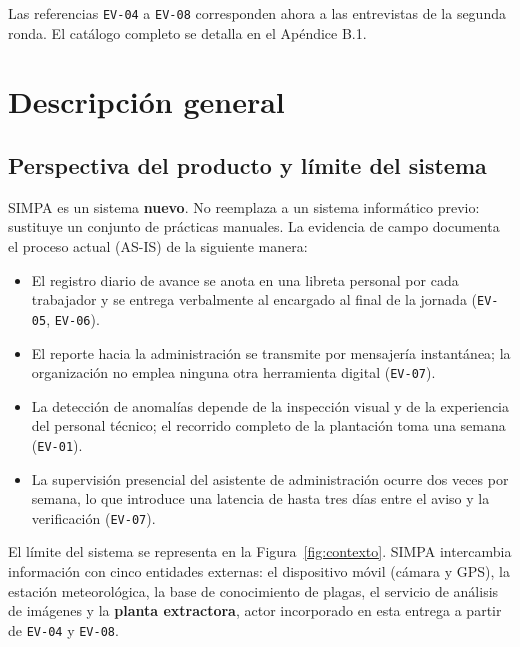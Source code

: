 \documentclass[11pt,a4paper]{article}
\newcommand{\id}[1]{\texttt{\begingroup\hyphenpenalty=10000\relax#1\endgroup}}
\renewcommand{\id}[1]{\texttt{#1}}
\begin{document}
\vspace{0.3cm}
\noindent Las referencias \id{EV-04} a \id{EV-08} corresponden ahora a las entrevistas de la segunda
ronda. El catálogo completo se detalla en el Apéndice B.1.

\newpage
\section{Descripción general}

\subsection{Perspectiva del producto y límite del sistema}

SIMPA es un sistema \textbf{nuevo}. No reemplaza a un sistema informático previo: sustituye un
conjunto de prácticas manuales. La evidencia de campo documenta el proceso actual (AS-IS) de la
siguiente manera:

\begin{itemize}[nosep]
  \item El registro diario de avance se anota en una libreta personal por cada trabajador y se
        entrega verbalmente al encargado al final de la jornada (\id{EV-05}, \id{EV-06}).
  \item El reporte hacia la administración se transmite por mensajería instantánea; la
        organización no emplea ninguna otra herramienta digital (\id{EV-07}).
  \item La detección de anomalías depende de la inspección visual y de la experiencia del personal
        técnico; el recorrido completo de la plantación toma una semana (\id{EV-01}).
  \item La supervisión presencial del asistente de administración ocurre dos veces por semana, lo
        que introduce una latencia de hasta tres días entre el aviso y la verificación (\id{EV-07}).
\end{itemize}

El límite del sistema se representa en la Figura~\ref{fig:contexto}. SIMPA intercambia información
con cinco entidades externas: el dispositivo móvil (cámara y GPS), la estación meteorológica, la
base de conocimiento de plagas, el servicio de análisis de imágenes y la \textbf{planta extractora},
actor incorporado en esta entrega a partir de \id{EV-04} y \id{EV-08}.
\end{document}

